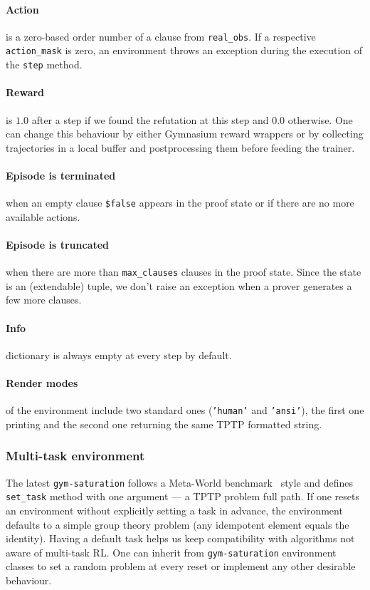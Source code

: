 \documentclass[runningheads]{llncs}
\begin{document}
\paragraph{Action} is a zero-based order number of a clause from \texttt{real\_obs}. If a respective \texttt{action\_mask} is zero, an environment throws an exception during the execution of the \texttt{step} method. \paragraph{Reward} is $1.0$ after a step if we found the refutation at this step and $0.0$ otherwise. One can change this behaviour by either Gymnasium reward wrappers or by collecting trajectories in a local buffer and postprocessing them before feeding the trainer. \paragraph{Episode is terminated} when an empty clause \texttt{\$false} appears in the proof state or if there are no more available actions. \paragraph{Episode is truncated} when there are more than \texttt{max\_clauses} clauses in the proof state. Since the state is an (extendable) tuple, we don't raise an exception when a prover generates a few more clauses. \paragraph{Info} dictionary is always empty at every step by default. \paragraph{Render modes} of the environment include two standard ones (\texttt{'human'} and \texttt{'ansi'}), the first one printing and the second one returning the same TPTP formatted string.
\subsubsection{Multi-task environment}
The latest \texttt{gym-saturation} follows a Meta-World benchmark~\cite{pmlr-v100-yu20a} style and defines \texttt{set\_task} method with one argument --- a TPTP problem full path. If one resets an environment without explicitly setting a task in advance, the environment defaults to a simple group theory problem (any idempotent element equals the identity). Having a default task helps us keep compatibility with algorithms not aware of multi-task RL. One can inherit from \texttt{gym-saturation} environment classes to set a random problem at every reset or implement any other desirable behaviour.
\end{document}
